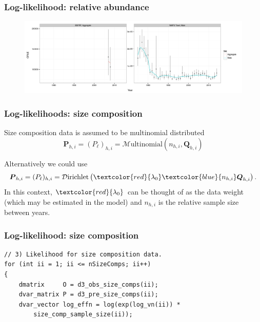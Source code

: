 \documentclass{beamer}
\begin{document}

\begin{frame}
\frametitle{Log-likelihood: relative abundance}
\begin{figure}[!htbp]
  \centering
  \includegraphics[width=\linewidth]{../../examples/bbrkc/OneSex/figure/cpue.png}
\end{figure}
\end{frame}


\begin{frame}
\frametitle{Log-likelihoods: size composition}
Size composition data is assumed to be multinomial distributed
\begin{equation*}
  \boldsymbol{P}_{h,i} = (P_\ell)_{h,i} = \mathcal{M}\text{ultinomial} \left( n_{h,i},
  \boldsymbol{Q}_{h,i} \right)
\end{equation*}

Alternatively we could use
\begin{equation*}
  \boldsymbol{P}_{h,i} = (P_\ell)_{h,i} = \mathcal{D}\text{irichlet} \left(
    \textcolor{red}{\lambda_0} \textcolor{blue}{n_{h,i}} \boldsymbol{Q}_{h,i} \right).
\end{equation*}
In this context, $\textcolor{red}{\lambda_0}$ can be thought of as the data
weight (which may be estimated in the model) and $n_{h,i}$ is the relative
sample size between years.
\end{frame}


\begin{frame}[fragile]
\frametitle{Log-likelihood: size composition}
\begin{verbatim}
// 3) Likelihood for size composition data. 
for (int ii = 1; ii <= nSizeComps; ii++)
{
    dmatrix     O = d3_obs_size_comps(ii);
    dvar_matrix P = d3_pre_size_comps(ii);
    dvar_vector log_effn = log(exp(log_vn(ii)) * 
        size_comp_sample_size(ii));
\end{verbatim}
\end{frame}
\end{document}
